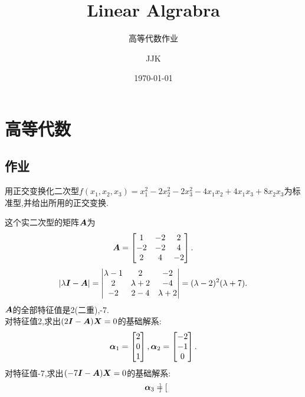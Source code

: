 \documentclass[lang=cn,11pt,normal]{elegantbook}
\title{Linear Algrabra}
\subtitle{高等代数作业}
\author{JJK}
\institute{Jiang Xi science and technology University}
\date{\today}
\begin{document}
	\maketitle
	\mainmatter
	\hypersetup{pageanchor=true}
	\chapter{高等代数}
	\section{作业}
	\begin{exercise}
		用正交变换化二次型$f(x_1,x_2,x_3)=x_1^2-2x_2^2-2x_3^2-4x_1x_2+4x_1x_3+8x_2x_3$为标准型,并给出所用的正交变换.
	\end{exercise}
	\begin{solution}
		这个实二次型的矩阵$\AA$为\\
		\begin{equation}
			\AA=
			\begin{bmatrix}
			1&-2&2\\
			-2&-2&4\\
			2&4&-2
			\end{bmatrix}.
		\end{equation}
		\begin{equation}
			|\lambda\II-\AA|=
			\begin{vmatrix}
			\lambda-1&2&-2\\
			2&\lambda+2&-4\\
			-2&2-4&\lambda+2
			\end{vmatrix}
			=(\lambda-2)^2(\lambda+7).
		\end{equation}
		$\AA$的全部特征值是2(二重),-7.\\
		对特征值2,求出$(2\II-\AA)\XX=0$的基础解系:
		\begin{equation}
		\bfaf_1=
		\begin{bmatrix}
		2\\
		0\\
		1
		\end{bmatrix},
		\bfaf_2=
		\begin{bmatrix}
		-2\\
		-1\\
		0
		\end{bmatrix}.
		\end{equation}
		对特征值-7,求出$(-7\II-\AA)\XX=0$的基础解系:\\
		\begin{equation}
		\bfaf_3=
		\begin{bmatrix}

\end{bmatrix}
\end{equation}
\end{solution}
\end{document}
